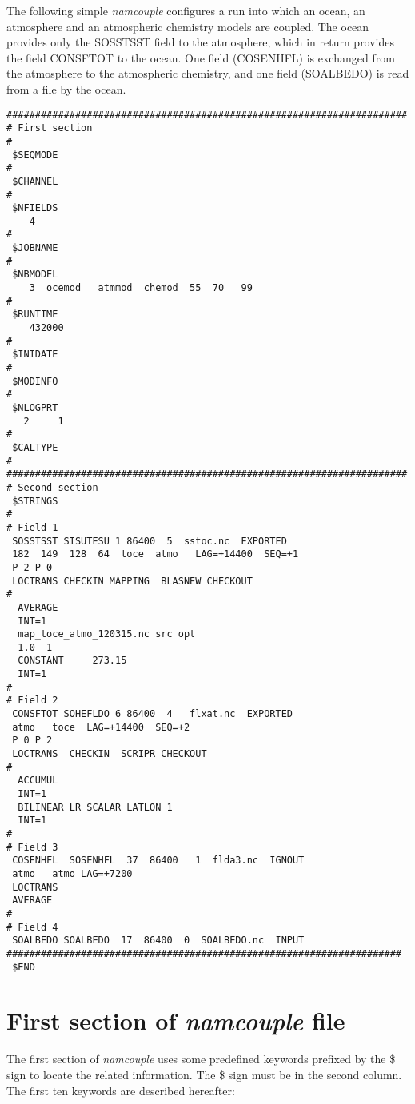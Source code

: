 The following simple {\it namcouple} configures a run into which an
ocean, an atmosphere and an atmospheric chemistry models are
coupled. The ocean provides only the SOSSTSST field to the atmosphere,
which in return provides the field CONSFTOT to the ocean. One field
(COSENHFL) is exchanged from the atmosphere to the atmospheric
chemistry, and one field (SOALBEDO) is read from a file by the ocean.

\begin{verbatim}
######################################################################
# First section
#
 $SEQMODE
#
 $CHANNEL
#
 $NFIELDS
    4  
#
 $JOBNAME
#
 $NBMODEL
    3  ocemod   atmmod  chemod  55  70   99 
#
 $RUNTIME
    432000
#
 $INIDATE
#
 $MODINFO
#
 $NLOGPRT
   2     1
#
 $CALTYPE
#
######################################################################
# Second section 
 $STRINGS
#
# Field 1
 SOSSTSST SISUTESU 1 86400  5  sstoc.nc  EXPORTED
 182  149  128  64  toce  atmo   LAG=+14400  SEQ=+1
 P 2 P 0
 LOCTRANS CHECKIN MAPPING  BLASNEW CHECKOUT 
#
  AVERAGE 
  INT=1
  map_toce_atmo_120315.nc src opt
  1.0  1
  CONSTANT     273.15 
  INT=1
#
# Field 2
 CONSFTOT SOHEFLDO 6 86400  4   flxat.nc  EXPORTED
 atmo   toce  LAG=+14400  SEQ=+2
 P 0 P 2
 LOCTRANS  CHECKIN  SCRIPR CHECKOUT
#
  ACCUMUL 
  INT=1
  BILINEAR LR SCALAR LATLON 1
  INT=1
#
# Field 3
 COSENHFL  SOSENHFL  37  86400   1  flda3.nc  IGNOUT 
 atmo   atmo LAG=+7200 
 LOCTRANS
 AVERAGE
#
# Field 4
 SOALBEDO SOALBEDO  17  86400  0  SOALBEDO.nc  INPUT
#####################################################################
 $END
\end{verbatim}


\section{ First section of {\it namcouple} file}
\label{subsec_namcouplefirst}

The first section of {\it namcouple } uses some predefined keywords
prefixed by the \$ sign to locate the related information. The \$ sign
must be in the second column. The first ten keywords are described
hereafter:

